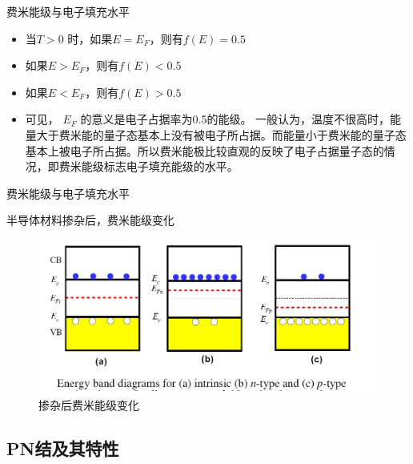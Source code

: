 \documentclass[trans]{beamer} %
\begin{document}

\begin{frame}{费米能级与电子填充水平}

                
    \begin{itemize}
        \item 当$T>0$     时，如果$E=E_F$，则有$f(E)=0.5$ 
        \item 如果$E>E_F$，则有$f(E)<0.5$ 
        \item 如果$E<E_F$，则有$f(E)>0.5$ 
        \item 可见， $E_F$  的意义是电子占据率为0.5的能级。
一般认为，温度不很高时，能量大于费米能的量子态基本上没有被电子所占据。而能量小于费米能的量子态基本上被电子所占据。所以\alert{费米能极比较直观的反映了电子占据量子态的情况，即费米能级标志电子填充能级的水平}。
        
    \end{itemize}
    
\end{frame}  

\begin{frame}{费米能级与电子填充水平}

       半导体材料掺杂后，费米能级变化         
    \begin{figure}[htbp] 
    \centering\includegraphics[height=2in]{source/ch2/fg221.png} 
    \caption{掺杂后费米能级变化}
    \end{figure}  
    
\end{frame}  

\subsection{PN结及其特性} 
\end{document}
